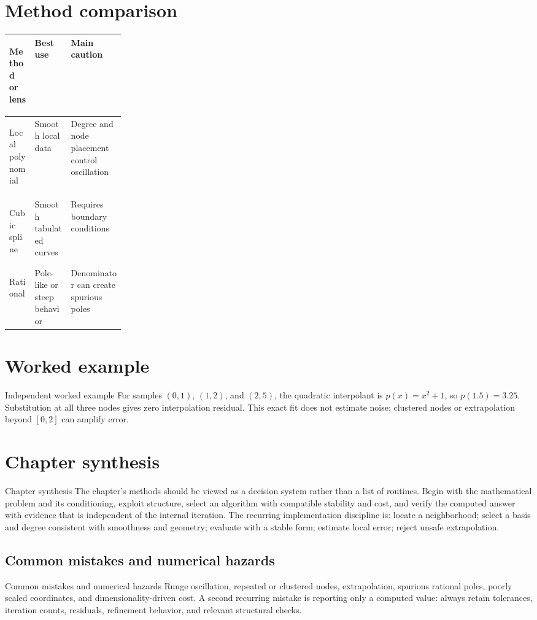 \documentclass[10pt,letterpaper]{article}
\begin{document}
\section*{Method comparison}
\begin{center}
\small
\begin{tabularx}{\linewidth}{>{\bfseries\raggedright\arraybackslash}p{0.22\linewidth}XX}
\toprule
Method or lens & Best use & Main caution \\
\midrule
Local polynomial & Smooth local data & Degree and node placement control oscillation \\
Cubic spline & Smooth tabulated curves & Requires boundary conditions \\
Rational & Pole-like or steep behavior & Denominator can create spurious poles \\
\bottomrule
\end{tabularx}
\end{center}

\section*{Worked example}
\begin{exambox}{Independent worked example}
For samples $(0,1)$, $(1,2)$, and $(2,5)$, the quadratic interpolant is $p(x)=x^2+1$, so $p(1.5)=3.25$.  Substitution at all three nodes gives zero interpolation residual.  This exact fit does not estimate noise; clustered nodes or extrapolation beyond $[0,2]$ can amplify error.
\end{exambox}

\section*{Chapter synthesis}
\begin{summarybox}{Chapter synthesis}
The chapter's methods should be viewed as a decision system rather than a list of routines.  Begin with the mathematical problem and its conditioning, exploit structure, select an algorithm with compatible stability and cost, and verify the computed answer with evidence that is independent of the internal iteration.  The recurring implementation discipline is: locate a neighborhood; select a basis and degree consistent with smoothness and geometry; evaluate with a stable form; estimate local error; reject unsafe extrapolation.
\end{summarybox}

\subsection*{Common mistakes and numerical hazards}
\begin{warnbox}{Common mistakes and numerical hazards}
Runge oscillation, repeated or clustered nodes, extrapolation, spurious rational poles, poorly scaled coordinates, and dimensionality-driven cost.  A second recurring mistake is reporting only a computed value: always retain tolerances, iteration counts, residuals, refinement behavior, and relevant structural checks.
\end{warnbox}
\end{document}
